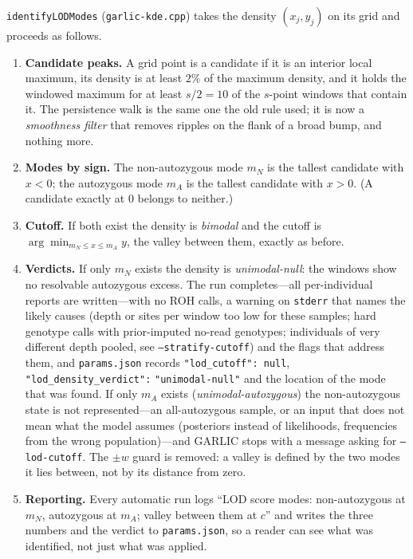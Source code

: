 \documentclass[11pt]{article}
\newcommand{\code}[1]{\texttt{#1}}
\begin{document}
\code{identifyLODModes} (\code{garlic-kde.cpp}) takes the density $(x_j,y_j)$ on its grid and proceeds as follows.
\begin{enumerate}[nosep]
\item \textbf{Candidate peaks.} A grid point is a candidate if it is an interior local maximum, its density is at least $2\%$ of the maximum density, and it holds the windowed maximum for at least $s/2=10$ of the $s$-point windows that contain it. The persistence walk is the same one the old rule used; it is now a \emph{smoothness filter} that removes ripples on the flank of a broad bump, and nothing more.
\item \textbf{Modes by sign.} The non-autozygous mode $m_N$ is the tallest candidate with $x<0$; the autozygous mode $m_A$ is the tallest candidate with $x>0$. (A candidate exactly at 0 belongs to neither.)
\item \textbf{Cutoff.} If both exist the density is \emph{bimodal} and the cutoff is $\arg\min_{m_N\le x\le m_A} y$, the valley between them, exactly as before.
\item \textbf{Verdicts.} If only $m_N$ exists the density is \emph{unimodal-null}: the windows show no resolvable autozygous excess. The run completes---all per-individual reports are written---with no ROH calls, a warning on \code{stderr} that names the likely causes (depth or sites per window too low for these samples; hard genotype calls with prior-imputed no-read genotypes; individuals of very different depth pooled, see \code{--stratify-cutoff}) and the flags that address them, and \code{params.json} records \code{"lod\_cutoff": null}, \code{"lod\_density\_verdict":} \code{"unimodal-null"} and the location of the mode that was found. If only $m_A$ exists (\emph{unimodal-autozygous}) the non-autozygous state is not represented---an all-autozygous sample, or an input that does not mean what the model assumes (posteriors instead of likelihoods, frequencies from the wrong population)---and GARLIC stops with a message asking for \code{--lod-cutoff}. The $\pm w$ guard is removed: a valley is defined by the two modes it lies between, not by its distance from zero.
\item \textbf{Reporting.} Every automatic run logs ``LOD score modes: non-autozygous at $m_N$, autozygous at $m_A$; valley between them at $c$'' and writes the three numbers and the verdict to \code{params.json}, so a reader can see what was identified, not just what was applied.
\end{enumerate}
\end{document}
